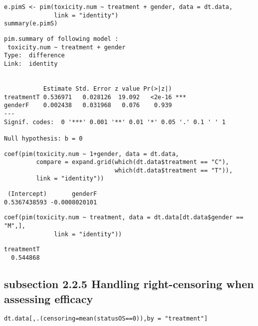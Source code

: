 \documentclass[12pt]{article}
\begin{document}
\lstset{language=r,label= ,caption= ,captionpos=b,numbers=none}
\begin{lstlisting}
e.pimS <- pim(toxicity.num ~ treatment + gender, data = dt.data,
              link = "identity")
summary(e.pimS)
\end{lstlisting}

\begin{verbatim}
pim.summary of following model : 
 toxicity.num ~ treatment + gender
Type:  difference 
Link:  identity 


           Estimate Std. Error z value Pr(>|z|)    
treatmentT 0.536971   0.028126  19.092   <2e-16 ***
genderF    0.002438   0.031968   0.076    0.939    
---
Signif. codes:  0 '***' 0.001 '**' 0.01 '*' 0.05 '.' 0.1 ' ' 1

Null hypothesis: b = 0
\end{verbatim}

\lstset{language=r,label= ,caption= ,captionpos=b,numbers=none}
\begin{lstlisting}
coef(pim(toxicity.num ~ 1+gender, data = dt.data,
         compare = expand.grid(which(dt.data$treatment == "C"),
                               which(dt.data$treatment == "T")),
         link = "identity"))

\end{lstlisting}

\begin{verbatim}
 (Intercept)       genderF 
0.5367438593 -0.0008020101
\end{verbatim}


\lstset{language=r,label= ,caption= ,captionpos=b,numbers=none}
\begin{lstlisting}
coef(pim(toxicity.num ~ treatment, data = dt.data[dt.data$gender == "M",],
              link = "identity"))
\end{lstlisting}

\begin{verbatim}
treatmentT 
  0.544868
\end{verbatim}

\subsection{subsection 2.2.5 Handling right-censoring when assessing efficacy}
\label{sec:org2174ff5}

\lstset{language=r,label= ,caption= ,captionpos=b,numbers=none}
\begin{lstlisting}
dt.data[,.(censoring=mean(statusOS==0)),by = "treatment"]
\end{lstlisting}
\end{document}
